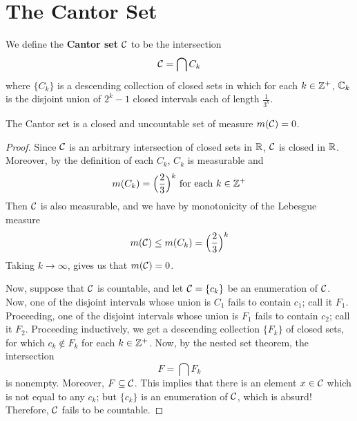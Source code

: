 \section{The Cantor Set}

\begin{definition}
    We define the \textbf{Cantor set} $\mathcal{C}$ to be the intersection
    \begin{equation*}
        \mathcal{C}=\bigcap{C_k}
    \end{equation*}
    where $\{C_k\}$ is a descending collection of closed sets in which for each
    $k \in \mathbb{Z}^+$,  $\mathbb{C}_k$ is the disjoint union of  $2^k-1$ closed intervals
    each of length  $\frac{1}{3^k}$.
\end{definition}

\begin{theorem}\label{8.7.1}
    The Cantor set is a closed and uncountable set of measure $m(\mathcal{C})=0$.
\end{theorem}
\begin{proof}
    Since $\mathcal{C}$ is an arbitrary intersection of closed sets in  $\mathbb{R}$,  $\mathcal{C}$ is
    closed in  $\mathbb{R}$. Moreover, by the definition of each  $C_k$,  $C_k$ is
    measurable and
    \begin{equation*}
        m(C_k)=\Big{(} \frac{2}{3} \Big{)}^k \text{ for each } k \in \mathbb{Z}^+
    \end{equation*}
    Then $\mathcal{C}$ is also measurable, and we have by monotonicity of the Lebesgue
    measure
    \begin{equation*}
        m(\mathcal{C}) \leq m(C_k)=\Big{(} \frac{2}{3} \Big{)}^k
    \end{equation*}
    Taking $k \xrightarrow{} \infty$, gives us that $m(\mathcal{C})=0$.

    Now, suppose that $\mathcal{C}$ is countable, and let $\mathcal{C}=\{c_k\}$ be an
    enumeration of $\mathcal{C}$. Now, one of the disjoint intervals whose union is
    $C_1$ fails to contain $c_1$; call it $F_1$. Proceeding, one of the disjoint
    intervals whose union is $F_1$ fails to contain $c_2$; call it $F_2$.
    Proceeding inductively, we get a descending collection $\{F_k\}$ of closed
    sets, for which $c_k \notin F_k$ for each  $k \in \mathbb{Z}^+$. Now, by the nested
    set theorem, the intersection
    \begin{equation*}
        F=\bigcap{F_k}
    \end{equation*}
    is nonempty. Moreover, $F \subseteq \mathcal{C}$. This implies that there is an
    element $x \in \mathcal{C}$ which is not equal to any $c_k$; but $\{c_k\}$ is an
    enumeration of $\mathcal{C}$, which is absurd! Therefore, $\mathcal{C}$ fails to be
    countable.
\end{proof}

